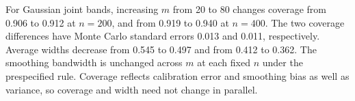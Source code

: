 For Gaussian joint bands, increasing $m$ from 20 to 80 changes coverage from 0.906 to 0.912 at $n=200$, and from 0.919 to 0.940 at $n=400$. The two coverage differences have Monte Carlo standard errors 0.013 and 0.011, respectively. Average widths decrease from 0.545 to 0.497 and from 0.412 to 0.362. The smoothing bandwidth is unchanged across $m$ at each fixed $n$ under the prespecified rule. Coverage reflects calibration error and smoothing bias as well as variance, so coverage and width need not change in parallel.
